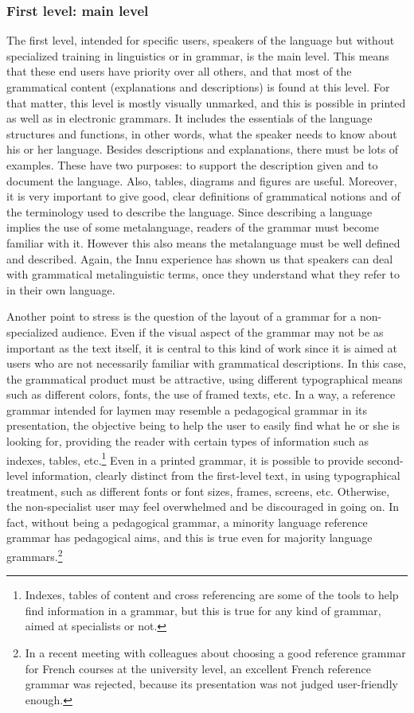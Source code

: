 \subsubsection{First level: main level} 
The first level, intended for specific users, speakers of the language but without specialized training in linguistics or in grammar, is the main level. This means that these end users have priority over all others, and that most of the grammatical content (explanations and descriptions) is found at this level. For that matter, this level is mostly visually unmarked, and this is possible in printed as well as in electronic grammars. It includes the essentials of the language structures and functions, in other words, what the speaker needs to know about his or her language. Besides descriptions and explanations, there must be lots of examples. These have two purposes: to support the description given and to document the language. Also, tables, diagrams and figures are useful. Moreover, it is very important to give good, clear definitions of grammatical notions and of the terminology used to describe the language. Since describing a language implies the use of some metalanguage, readers of the grammar must become familiar with it. However this also means the metalanguage must be well defined and described. Again, the Innu experience has shown us that speakers can deal with grammatical metalinguistic terms, once they understand what they refer to in their own language. 

Another point to stress is the question of the layout of a grammar for a non-specialized audience. Even if the visual aspect of the grammar may not be as important as the text itself, it is central to this kind of work since it is aimed at users who are not necessarily familiar with grammatical descriptions. In this case, the grammatical product must be attractive, using different typographical means such as different colors, fonts, the use of framed texts, etc. In a way, a reference grammar intended for laymen may resemble a pedagogical grammar in its presentation, the objective being to help the user to easily find what he or she is looking for, providing the reader with certain types of information such as indexes, tables, etc.\footnote{Indexes,
 tables of content and cross referencing are some of the tools to help find information in a grammar, but this is true for any kind of grammar, aimed at specialists or not.
} 
Even in a printed grammar, it is possible to provide second-level information, clearly distinct from the first-level text, in using typographical treatment, such as different fonts or font sizes, frames, screens, etc. Otherwise, the non-specialist user may feel overwhelmed and be discouraged in going on. In fact, without being a pedagogical grammar, a minority language reference grammar has pedagogical aims, and this is true even for majority language grammars.\footnote{In
 a recent meeting with colleagues about choosing a good reference grammar for French courses at the university level, an excellent French reference grammar was rejected, because its presentation was not judged user-friendly enough.
}{}

